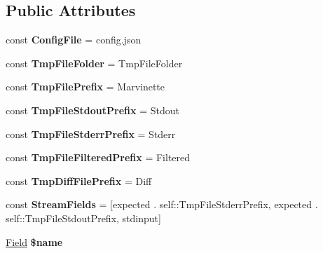 \subsection*{Public Attributes}
\begin{DoxyCompactItemize}
\item 
\mbox{\label{classTest_af26d84c2c2033fdbdd33eaf85c67c0ea}} 
const {\bfseries Config\+File} = \textquotesingle{}config.\+json\textquotesingle{}
\item 
\mbox{\label{classTest_ae1b59bffc7abfa6aa0f85566b410def5}} 
const {\bfseries Tmp\+File\+Folder} = Tmp\+File\+Folder
\item 
\mbox{\label{classTest_ade02b87da948e70b2f55a3132928b039}} 
const {\bfseries Tmp\+File\+Prefix} = \textquotesingle{}Marvinette\textquotesingle{}
\item 
\mbox{\label{classTest_a083345e9a23e8c1eb45a2b0350e9f9dc}} 
const {\bfseries Tmp\+File\+Stdout\+Prefix} = \textquotesingle{}Stdout\textquotesingle{}
\item 
\mbox{\label{classTest_ad836169e38502a831a67ed44bec603d4}} 
const {\bfseries Tmp\+File\+Stderr\+Prefix} = \textquotesingle{}Stderr\textquotesingle{}
\item 
\mbox{\label{classTest_a659ffaf5e33a76f74a324a1704a453b9}} 
const {\bfseries Tmp\+File\+Filtered\+Prefix} = \textquotesingle{}Filtered\textquotesingle{}
\item 
\mbox{\label{classTest_a279a9761018d06d3fc0ae670984c611b}} 
const {\bfseries Tmp\+Diff\+File\+Prefix} = \textquotesingle{}Diff\textquotesingle{}
\item 
\mbox{\label{classTest_a73668b573223cd0a0a655955a1b78b80}} 
const {\bfseries Stream\+Fields} = \mbox{[}\textquotesingle{}expected\textquotesingle{} . self\+::\+Tmp\+File\+Stderr\+Prefix, \textquotesingle{}expected\textquotesingle{} . self\+::\+Tmp\+File\+Stdout\+Prefix, \textquotesingle{}stdinput\textquotesingle{}\mbox{]}
\item 
\mbox{\label{classTest_a9c07752de0d3fb837da28d4a8a81beb8}} 
\hyperlink{classField}{Field} {\bfseries \$name}

\end{DoxyCompactItemize}
